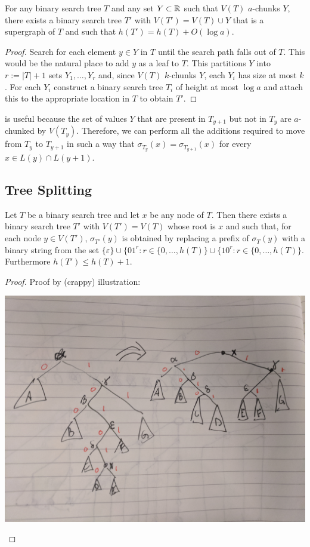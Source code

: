 \documentclass[kpfonts]{patmorin}
\begin{document}
\begin{lem}
  For any binary search tree $T$ and any set $Y\subset\mathbb{R} $ such that $V(T)$ $a$-chunks $Y$, there exists a binary search tree $T'$ with $V(T')=V(T)\cup Y$ that is a supergraph of $T$ and such that $h(T')=h(T)+O(\log a)$.
\end{lem}

\begin{proof}
  Search for each element $y\in Y$ in $T$ until the search path falls out of $T$.  This would be the natural place to add $y$ as a leaf to $T$.  This partitions $Y$ into $r:=|T|+1$ sets $Y_1,\ldots,Y_r$ and, since $V(T)$ $k$-chunks $Y$, each $Y_i$ has size at most $k$.  For each $Y_i$ construct a binary search tree $T_i$ of height at most $\log a$ and attach this to the appropriate location in $T$ to obtain $T'$.
\end{proof}

 is useful because the set of values $Y$ that are present in $T_{y+1}$ but not in $T_y$ are $a$-chunked by $V(T_y)$. Therefore, we can perform all the additions required to move from $T_y$ to $T_{y+1}$ in such a way that $\sigma_{T_y}(x)=\sigma_{T_{y+1}}(x)$ for every $x\in L(y)\cap L(y+1)$.  

\subsection{Tree Splitting}

\begin{lem}
  Let $T$ be a binary search tree and let $x$ be any node of $T$.  Then there exists a binary search tree $T'$ with $V(T')=V(T)$ whose root is $x$ and such that, for each node $y\in V(T')$, $\sigma_{T'}(y)$ is obtained by replacing a prefix of $\sigma_{T}(y)$ with a binary string from the set $\{\varepsilon\}\cup \{01^r:r\in\{0,\ldots,h(T)\}\cup \{10^r:r\in\{0,\ldots,h(T)\}$.  Furthermore $h(T')\le h(T)+1$.
\end{lem}

\begin{proof}
Proof by (crappy) illustration:
  \begin{center}
    \includegraphics[width=.6\textwidth]{images/split}
  \end{center}
\end{proof}
\end{document}
